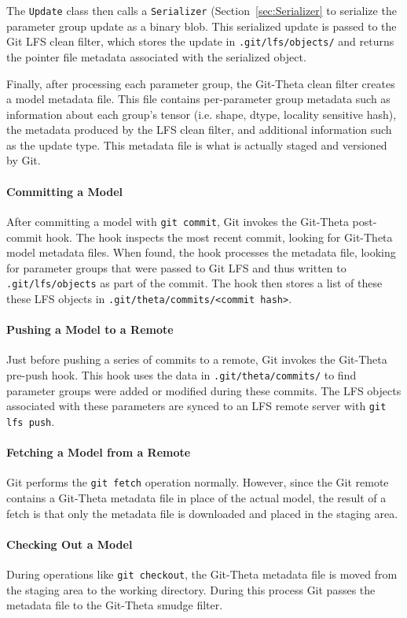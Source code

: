 \documentclass[nohyperref]{article}
\def\code#1{\texttt{#1}}
\theoremstyle{plain}
\theoremstyle{definition}
\theoremstyle{remark}
\begin{document}
The \code{Update} class then  calls a \code{Serializer} (Section~\ref{sec:Serializer} to serialize the parameter group update as a binary blob. This serialized update is passed to the Git LFS clean filter, which stores the update in \code{.git/lfs/objects/} and returns the pointer file metadata associated with the serialized object.

Finally, after processing each parameter group, the Git-Theta clean filter creates a model metadata file. This file contains per-parameter group metadata such as information about each group's tensor (i.e. shape, dtype, locality sensitive hash), the metadata produced by the LFS clean filter, and additional information such as the update type. This metadata file is what is actually staged and versioned by Git.

\paragraph{Committing a Model}
After committing a model with \code{git commit}, Git invokes the Git-Theta post-commit hook. The hook inspects the most recent commit, looking for Git-Theta model metadata files. When found, the hook processes the metadata file, looking for parameter groups that were passed to Git LFS and thus written to \code{.git/lfs/objects} as part of the commit. The hook then stores a list of these these LFS objects in \code{.git/theta/commits/<commit\ hash>}.

\paragraph{Pushing a Model to a Remote}
Just before pushing a series of commits to a remote, Git invokes the Git-Theta pre-push hook. This hook uses the data in \code{.git/theta/commits/} to find parameter groups were added or modified during these commits. The LFS objects associated with these parameters are synced to an LFS remote server with \code{git lfs push}.

\paragraph{Fetching a Model from a Remote}
Git performs the \code{git fetch} operation normally. However, since the Git remote contains a Git-Theta metadata file in place of the actual model, the result of a fetch is that only the metadata file is downloaded and placed in the staging area.

\paragraph{Checking Out a Model}
During operations like \code{git checkout}, the Git-Theta metadata file is moved from the staging area to the working directory. During this process Git passes the metadata file to the Git-Theta smudge filter. 
\end{document}
